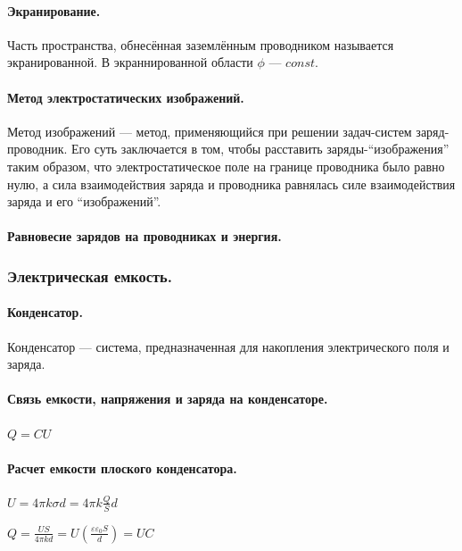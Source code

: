 \documentclass{article}
\begin{document}
            \paragraph{Экранирование.}
                Часть пространства, обнесённая заземлённым проводником называется экранированной. В экраннированной области \(\phi\) --- \(const\).
            \paragraph{Метод электростатических изображений.}
                Метод изображений --- метод, применяющийся при решении задач-систем заряд-проводник. Его суть заключается в том, чтобы расставить заряды-``изображения'' таким образом, что электростатическое поле на границе проводника было равно нулю, а сила взаимодействия заряда и проводника равнялась силе взаимодействия заряда и его ``изображений''.
            \paragraph{Равновесие зарядов на проводниках и энергия.}
        \subsubsection{Электрическая емкость.}
            \paragraph{Конденсатор.}
                Конденсатор --- система, предназначенная для накопления электрического поля и заряда.
            \paragraph{Связь емкости, напряжения и заряда на конденсаторе.}
                \(Q = CU\)
            \paragraph{Расчет емкости плоского конденсатора.}
                \(U = 4\pi k\sigma d = 4\pi k \frac{Q}{S}d\)

                \(Q = \frac{US}{4\pi kd} = U(\frac{\varepsilon\varepsilon_0 S}{d}) = UC\)
\end{document}
